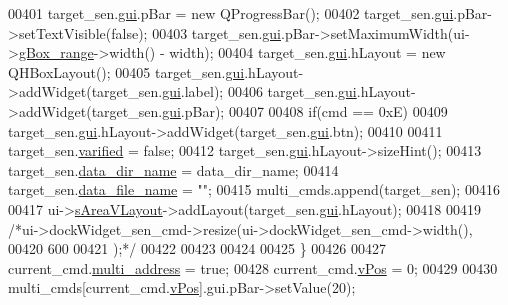 \begin{DoxyCode}
00401            target\_sen.\hyperlink{a00001_a7758f566562596be39abf215046e32f0}{gui}.pBar  = \textcolor{keyword}{new} QProgressBar();
00402            target\_sen.\hyperlink{a00001_a7758f566562596be39abf215046e32f0}{gui}.pBar->setTextVisible(\textcolor{keyword}{false});
00403            target\_sen.\hyperlink{a00001_a7758f566562596be39abf215046e32f0}{gui}.pBar->setMaximumWidth(ui->\hyperlink{a00027_a3c12d0504a310784c3820d1a9ad469c2}{gBox\_range}->width() - width);
00404            target\_sen.\hyperlink{a00001_a7758f566562596be39abf215046e32f0}{gui}.hLayout = \textcolor{keyword}{new} QHBoxLayout();
00405            target\_sen.\hyperlink{a00001_a7758f566562596be39abf215046e32f0}{gui}.hLayout->addWidget(target\_sen.\hyperlink{a00001_a7758f566562596be39abf215046e32f0}{gui}.label);
00406            target\_sen.\hyperlink{a00001_a7758f566562596be39abf215046e32f0}{gui}.hLayout->addWidget(target\_sen.\hyperlink{a00001_a7758f566562596be39abf215046e32f0}{gui}.pBar);
00407 
00408           \textcolor{keywordflow}{if}(cmd == 0xE)
00409            target\_sen.\hyperlink{a00001_a7758f566562596be39abf215046e32f0}{gui}.hLayout->addWidget(target\_sen.\hyperlink{a00001_a7758f566562596be39abf215046e32f0}{gui}.btn);
00410 
00411            target\_sen.\hyperlink{a00001_a0438d70fa5f3dd26987180982ee28352}{varified} = \textcolor{keyword}{false};
00412            target\_sen.\hyperlink{a00001_a7758f566562596be39abf215046e32f0}{gui}.hLayout->sizeHint();
00413            target\_sen.\hyperlink{a00001_ab96a1a110eea887a27173c37866e876e}{data\_dir\_name} = data\_dir\_name;
00414            target\_sen.\hyperlink{a00001_a76c985468c91b36f693cbaf858297d9f}{data\_file\_name} = \textcolor{stringliteral}{""};
00415            multi\_cmds.append(target\_sen);
00416 
00417            ui->\hyperlink{a00027_a2bdce9ad313cd4ee575613f36cbc4678}{sAreaVLayout}->addLayout(target\_sen.\hyperlink{a00001_a7758f566562596be39abf215046e32f0}{gui}.hLayout);
00418 
00419            \textcolor{comment}{/*ui->dockWidget\_sen\_cmd->resize(ui->dockWidget\_sen\_cmd->width(),}
00420 \textcolor{comment}{                                        600}
00421 \textcolor{comment}{                                         );*/}
00422 
00423 
00424 
00425           \}
00426 
00427           current\_cmd.\hyperlink{a00001_a8e69b971c61ced27a7567efd2bf0db59}{multi\_address} = \textcolor{keyword}{true};
00428           current\_cmd.\hyperlink{a00001_a2b48b371fd84be2a8ad581b1ad708b88}{vPos} = 0;
00429 
00430           multi\_cmds[current\_cmd.\hyperlink{a00001_a2b48b371fd84be2a8ad581b1ad708b88}{vPos}].gui.pBar->setValue(20);

\end{DoxyCode}

